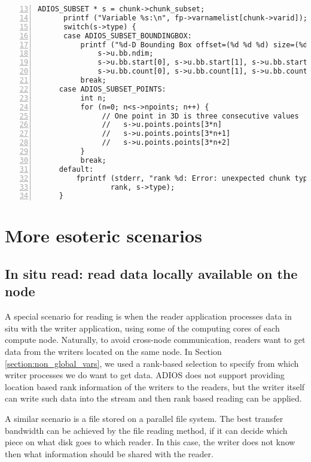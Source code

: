 \begin{lstlisting}[numbers=left, numberstyle=\color{gray}, stepnumber=2,firstnumber=13,
                             caption={Processing chunks from a file}, label=code:process_chunk]
      ADIOS_SUBSET * s = chunk->chunk_subset;
      printf ("Variable %s:\n", fp->varnamelist[chunk->varid]);
      switch(s->type) {
      case ADIOS_SUBSET_BOUNDINGBOX:
          printf ("%d-D Bounding Box offset=(%d %d %d) size=(%d %d %d)\n",
              s->u.bb.ndim;
              s->u.bb.start[0], s->u.bb.start[1], s->u.bb.start[2],
              s->u.bb.count[0], s->u.bb.count[1], s->u.bb.count[2]);
          break;
     case ADIOS_SUBSET_POINTS:
          int n;
          for (n=0; n<s->npoints; n++) {
               // One point in 3D is three consecutive values
               //   s->u.points.points[3*n]
               //   s->u.points.points[3*n+1]
               //   s->u.points.points[3*n+2]
          }
          break;
     default:
         fprintf (stderr, "rank %d: Error: unexpected chunk type: %d\n",
                 rank, s->type);
     }  
 \end{lstlisting}



\section {More esoteric scenarios}


\subsection{In situ read: read data locally available on the node}
A special scenario for reading is when the reader application processes data in situ with the writer application, using some of the computing cores of each compute node. Naturally, to avoid cross-node communication, readers want to get data from the writers located on the same node. In Section \ref {section:non_global_vars}, we used a rank-based selection to specify from which writer processes we do want to get data. ADIOS does not support providing location based rank information of the writers to the readers, but the writer itself can write such data into the stream and then rank based reading can be applied. 

A similar scenario is a file stored on a parallel file system. The best transfer bandwidth can be achieved by the file reading method, if it can decide which piece on what disk goes to which reader. In this case, the writer does not know then what information should be shared with the reader. 


